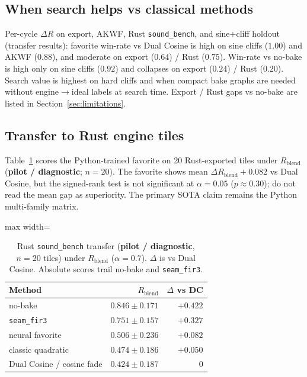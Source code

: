 \subsection{When search helps vs classical methods}
\label{sec:transfer}

Per-cycle $\Delta R$ on export, AKWF, Rust \texttt{sound\_bench}, and sine{+}cliff holdout
(transfer results):
favorite win-rate vs Dual Cosine is high on sine cliffs ($1.00$) and AKWF ($0.88$), and moderate on export ($0.64$) / Rust ($0.75$).
Win-rate vs no-bake is high only on sine cliffs ($0.92$) and collapses on export ($0.24$) / Rust ($0.20$).
Search value is highest on hard cliffs and when compact bake graphs are needed without engine$\to$ideal labels at search time.
Export / Rust gaps vs no-bake are listed in Section~\ref{sec:limitations}.

\subsection{Transfer to Rust engine tiles}
\label{sec:rust-bench}

Table~\ref{tab:rust-bench} scores the Python-trained favorite on 20 Rust-exported tiles under $R_{\mathrm{blend}}$ (\textbf{pilot / diagnostic}; $n{=}20$).
The favorite shows mean $\Delta R_{\mathrm{blend}}{+}0.082$ vs Dual Cosine, but the signed-rank test is not significant at $\alpha{=}0.05$ ($p{\approx}0.30$); do not read the mean gap as superiority.
The primary SOTA claim remains the Python multi-family matrix.

\begin{table}[t]
  \centering
  \caption{Rust \texttt{sound\_bench} transfer (\textbf{pilot / diagnostic}, $n{=}20$ tiles) under $R_{\mathrm{blend}}$ ($\alpha{=}0.7$).
  $\Delta$ is vs Dual Cosine. Absolute scores trail no-bake and \texttt{seam\_fir3}.}
  \label{tab:rust-bench}
  \setlength{\tabcolsep}{6pt}
  \begin{adjustbox}{max width=\columnwidth}
\begin{tabular}{@{}lrr@{}}
    \toprule
    Method & $R_{\mathrm{blend}}$ & $\Delta$ vs DC \\
    \midrule
    no-bake & $0.846\pm0.171$ & ${+}0.422$ \\
    \texttt{seam\_fir3} & $0.751\pm0.157$ & ${+}0.327$ \\
    neural favorite & $0.506\pm0.236$ & ${+}0.082$ \\
    classic quadratic & $0.474\pm0.186$ & ${+}0.050$ \\
    Dual Cosine / cosine fade & $0.424\pm0.187$ & $0$ \\
    \bottomrule
  \end{tabular}
\end{adjustbox}
\end{table}

